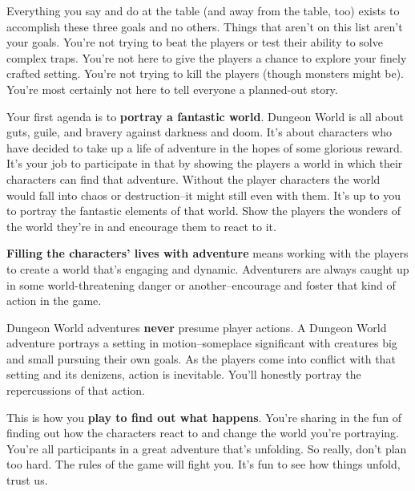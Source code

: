  Everything you say and do at the table (and away from the table, too) exists to accomplish these three goals and no others. Things that aren't on this list aren't your goals. You're not trying to beat the players or test their ability to solve complex traps. You're not here to give the players a chance to explore your finely crafted setting. You're not trying to kill the players (though monsters might be). You're most certainly not here to tell everyone a planned-out story.


 Your first agenda is to \textbf{portray a fantastic world}. Dungeon World is all about guts, guile, and bravery against darkness and doom. It's about characters who have decided to take up a life of adventure in the hopes of some glorious reward. It's your job to participate in that by showing the players a world in which their characters can find that adventure. Without the player characters the world would fall into chaos or destruction--it might still even with them. It's up to you to portray the fantastic elements of that world. Show the players the wonders of the world they're in and encourage them to react to it.


 \textbf{Filling the characters' lives with adventure}
 means working with the players to create a world that's engaging and dynamic. Adventurers are always caught up in some world-threatening danger or another--encourage and foster that kind of action in the game.


 Dungeon World adventures \textbf{never}
 presume player actions. A Dungeon World adventure portrays a setting in motion--someplace significant with creatures big and small pursuing their own goals. As the players come into conflict with that setting and its denizens, action is inevitable. You'll honestly portray the repercussions of that action.


 This is how you \textbf{play to find out what happens}. You're sharing in the fun of finding out how the characters react to and change the world you're portraying. You're all participants in a great adventure that's unfolding. So really, don't plan too hard. The rules of the game will fight you. It's fun to see how things unfold, trust us.


 
